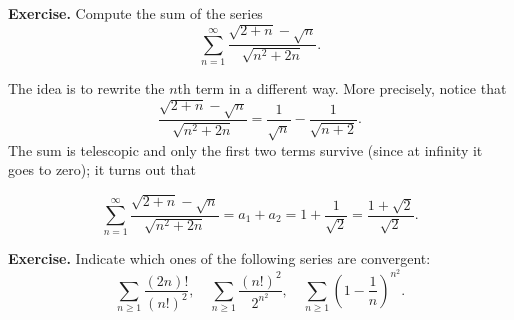 \documentclass[a4paper,10 pt]{report}
\newcommand{\finalanswer}[1]{%
    \begin{finalAnswer}
    \[
        #1
    \]
    \end{finalAnswer}
}
\theoremstyle{definition}
\begin{document}
\begin{exerciseBox} \textbf{Exercise.} Compute the sum of the series
\begin{equation*}\sum_{n = 1}^\infty \frac{\sqrt{2 + n} - \sqrt{n}}{\sqrt{n^2 + 2n}}.\end{equation*} \end{exerciseBox}

\begin{solutionBox} The idea is to rewrite the $n$th term in a different way. More precisely, notice that
\begin{equation*}\frac{\sqrt{2 + n} - \sqrt{n}}{\sqrt{n^2 + 2n}} = \frac{1}{\sqrt{n}} - \frac{1}{\sqrt{n + 2}}.\end{equation*}
The sum is telescopic and only the first two terms survive (since at infinity it goes to zero); it turns out that
\finalanswer{
\sum_{n = 1}^\infty \frac{\sqrt{2 + n} - \sqrt{n}}{\sqrt{n^2 + 2n}} = a_1 + a_2 = 1 + \frac{1}{\sqrt{2}} = \frac{1 + \sqrt{2}}{\sqrt{2}}.
}\end{solutionBox}

\begin{exerciseBox} \textbf{Exercise.}  Indicate which ones of the following series are convergent:
\begin{equation*}\sum_{n \geq 1} \frac{(2n)!}{(n!)^2}, \quad \sum_{n \geq 1} \frac{(n!)^2}{2^{n^2}}, \quad \sum_{n \geq 1} \left( 1 - \frac{1}{n} \right)^{n^2}.\end{equation*} \end{exerciseBox}
\end{document}
